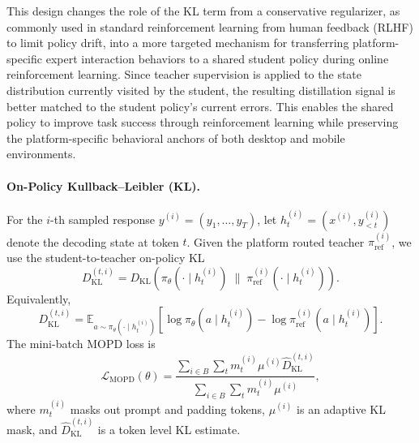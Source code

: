 This design changes the role of the KL term from a conservative regularizer,
as commonly used in standard reinforcement learning from human feedback
(RLHF) to limit policy drift, into a more targeted mechanism for transferring
platform-specific expert interaction behaviors to a shared student policy
during online reinforcement learning. Since teacher supervision is applied to
the state distribution currently visited by the student, the resulting
distillation signal is better matched to the student policy's current errors.
This enables the shared policy to improve task success through reinforcement
learning while preserving the platform-specific behavioral anchors of both
desktop and mobile environments.




\paragraph{On-Policy Kullback--Leibler (KL).}
For the $i$-th sampled response $y^{(i)}=(y_1,\ldots,y_T)$, let
$h_t^{(i)}=(x^{(i)},y_{<t}^{(i)})$ denote the decoding state at token $t$.
Given the platform routed teacher $\pi_{\mathrm{ref}}^{(i)}$, we use the
student-to-teacher on-policy KL
\begin{equation}
D_{\mathrm{KL}}^{(t,i)}
=
D_{\mathrm{KL}}
\left(
\pi_\theta(\cdot \mid h_t^{(i)})
\;\|\;
\pi_{\mathrm{ref}}^{(i)}(\cdot \mid h_t^{(i)})
\right).
\label{eq:mopd_kl}
\end{equation}
Equivalently,
\begin{equation}
D_{\mathrm{KL}}^{(t,i)}
=
\mathbb{E}_{a \sim \pi_\theta(\cdot \mid h_t^{(i)})}
\left[
\log \pi_\theta(a \mid h_t^{(i)})
-
\log \pi_{\mathrm{ref}}^{(i)}(a \mid h_t^{(i)})
\right].
\label{eq:mopd_kl_expectation}
\end{equation}
The mini-batch MOPD loss is
\begin{equation}
\mathcal{L}_{\mathrm{MOPD}}(\theta)
=
\frac{
  \sum_{i \in B}\sum_t m_t^{(i)}\mu^{(i)}
  \hat{D}_{\mathrm{KL}}^{(t,i)}
}{
  \sum_{i \in B}\sum_t m_t^{(i)}\mu^{(i)}
},
\label{eq:mopd_loss}
\end{equation}
where $m_t^{(i)}$ masks out prompt and padding tokens, $\mu^{(i)}$ is an
adaptive KL mask, and $\hat{D}_{\mathrm{KL}}^{(t,i)}$ is a token level KL
estimate.

